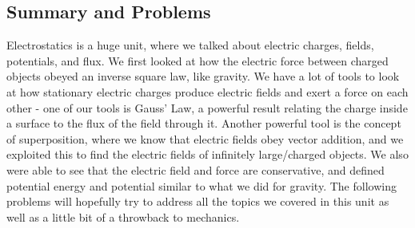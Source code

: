 \subsection{Summary and Problems}
Electrostatics is a huge unit, where we talked about electric charges, fields, potentials, and flux. We first looked at how the electric force between charged objects obeyed an inverse square law, like gravity. We have a lot of tools to look at how stationary electric charges produce electric fields and exert a force on each other - one of our tools is Gauss' Law, a powerful result relating the charge inside a surface to the flux of the field through it. Another powerful tool is the concept of superposition, where we know that electric fields obey vector addition, and we exploited this to find the electric fields of infinitely large/charged objects. We also were able to see that the electric field and force are conservative, and defined potential energy and potential similar to what we did for gravity. The following problems will hopefully try to address all the topics we covered in this unit as well as a little bit of a throwback to mechanics. \\


